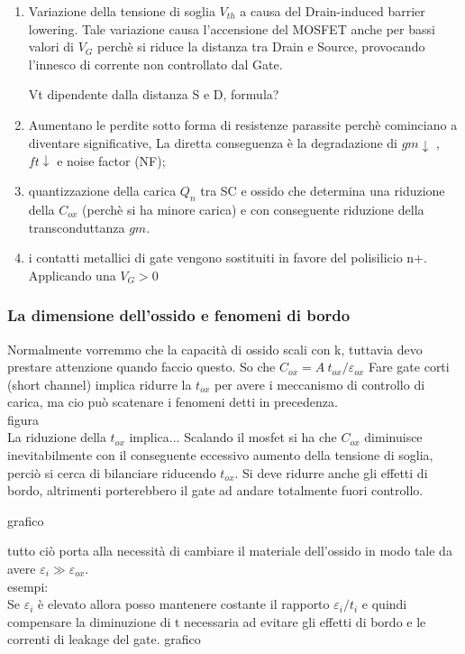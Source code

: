 \begin{enumerate}
    \item Variazione della tensione di soglia $V_{th}$ a causa del Drain-induced barrier lowering.
    Tale variazione causa l'accensione del MOSFET anche per bassi valori di $V_G$ perchè si riduce la distanza tra Drain e Source, provocando l'innesco di corrente non controllato dal Gate.
    \begin{ripasso}
        Vt dipendente dalla distanza S e D, formula?
    \end{ripasso}
    \item Aumentano le perdite sotto forma di resistenze parassite perchè cominciano a diventare significative, La diretta conseguenza è la degradazione di $gm \downarrow$ , $ft\downarrow$ e noise factor (NF);
    \item quantizzazione della carica $Q_n$ tra SC e ossido che determina una riduzione della $C_{ox}$ (perchè si ha minore carica) e con conseguente riduzione della transconduttanza $gm$.
    \item i contatti metallici di gate vengono sostituiti in favore del polisilicio n+.
    Applicando una $V_G>0$
\end{enumerate}
%
\subsubsection{La dimensione dell'ossido e fenomeni di bordo}
Normalmente vorremmo che la capacità di ossido scali con k, tuttavia devo prestare attenzione quando faccio questo.
So che $C_{ox}=A\ t_{ox}/\varepsilon_{ox}$
 Fare gate corti (short channel) implica ridurre la $t_{ox}$ per avere i meccanismo di controllo di carica, ma cio può scatenare i fenomeni detti in precedenza.\\
 figura\\
 La riduzione della $t_{ox}$ implica...
 Scalando il mosfet si ha che $C_{ox}$ diminuisce inevitabilmente con il conseguente eccessivo aumento della tensione di soglia, perciò si cerca di bilanciare riducendo $t_{ox}$.
 Si deve ridurre anche gli effetti di bordo, altrimenti porterebbero il gate ad andare totalmente fuori controllo.

 grafico

 tutto ciò porta alla necessità di cambiare il materiale dell'ossido in modo tale da avere $\varepsilon_i \gg \varepsilon_{ox}$.\\
 esempi:\\
 Se $\varepsilon_i$ è elevato allora posso mantenere costante il rapporto $\varepsilon_i/t_i$ e quindi compensare la diminuzione di t necessaria ad evitare gli effetti di bordo e le correnti di leakage del gate.
 grafico

